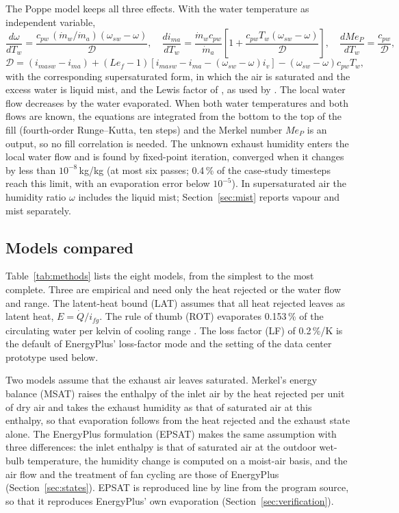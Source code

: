\documentclass[preprint,12pt]{elsarticle}
\begin{document}
The Poppe model \citep{poppe1991berechnung,kloppers2005critical} keeps all three effects. With the water temperature as
independent variable,
\begin{equation}
\frac{d\omega}{dT_w} = \frac{c_{pw}\,(\dot m_w/\dot m_a)(\omega_{sw}-\omega)}{\mathcal{D}},\quad
\frac{di_{ma}}{dT_w} = \frac{\dot m_w c_{pw}}{\dot m_a}\left[1+\frac{c_{pw}T_w(\omega_{sw}-\omega)}{\mathcal{D}}\right],\quad
\frac{dMe_P}{dT_w} = \frac{c_{pw}}{\mathcal{D}},
\end{equation}
\begin{equation}
\mathcal{D} = (i_{masw}-i_{ma}) + (Le_f-1)\left[i_{masw}-i_{ma}-(\omega_{sw}-\omega)i_v\right] - (\omega_{sw}-\omega)c_{pw}T_w,
\end{equation}
with the corresponding supersaturated form, in which the air is saturated and the excess water is liquid mist, and the
Lewis factor of \citet{bosnjakovic1965technical}, as used by \citet{kloppers2005lewis}. The local water flow decreases
by the water evaporated. When both water temperatures and both flows are known, the equations are integrated from the
bottom to the top of the fill (fourth-order Runge--Kutta, ten steps) and the Merkel number $Me_P$ is an output, so no
fill correlation is needed. The unknown exhaust humidity enters the local water flow and is found by fixed-point
iteration, converged when it changes by less than $10^{-8}$\,kg/kg (at most six passes; 0.4\,\% of the case-study
timesteps reach this limit, with an evaporation error below $10^{-5}$). In supersaturated air the humidity ratio
$\omega$ includes the liquid mist; Section~\ref{sec:mist} reports vapour and mist separately.

\subsection{Models compared}
Table~\ref{tab:methods} lists the eight models, from the simplest to the most complete. Three are empirical and
need only the heat rejected or the water flow and range. The latent-heat bound (LAT) assumes that all heat rejected
leaves as latent heat, $E=\dot Q/i_{fg}$. The rule of thumb (ROT) evaporates 0.153\,\% of the circulating water per
kelvin of cooling range \citep{green2008perrys}. The loss factor (LF) of 0.2\,\%/K is the default of EnergyPlus'
loss-factor mode and the setting of the data center prototype used below.

Two models assume that the exhaust air leaves saturated. Merkel's energy balance (MSAT) raises the enthalpy of the
inlet air by the heat rejected per unit of dry air and takes the exhaust humidity as that of saturated air at this
enthalpy, so that evaporation follows from the heat rejected and the exhaust state alone. The EnergyPlus formulation
(EPSAT) \citep{doe2022engref} makes the same assumption with three differences: the inlet enthalpy is that of saturated
air at the outdoor wet-bulb temperature, the humidity change is computed on a moist-air basis, and the air flow and the
treatment of fan cycling are those of EnergyPlus (Section~\ref{sec:states}). EPSAT is reproduced line by line from the
program source, so that it reproduces EnergyPlus' own evaporation (Section~\ref{sec:verification}).
\end{document}
